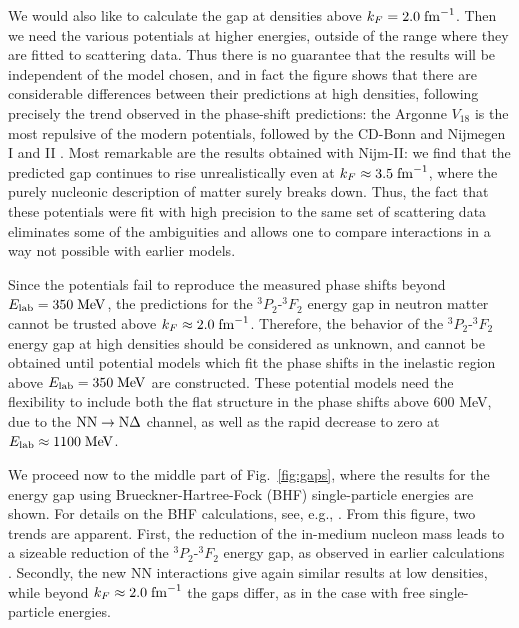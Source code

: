 \documentclass[preprint,rmp,aps,floatfix]{revtex4}
\begin{document}
We would also like to calculate the gap at densities above 
$k_F=2.0\;{\rm fm}^{-1}$.  
Then we need the various potentials at higher energies, 
outside of the range where they are fitted to scattering data.  
Thus there is no guarantee that 
the results will be independent of the model chosen, and in fact 
the figure shows that there are considerable differences 
between their predictions at high densities,
following precisely the trend observed in the phase-shift predictions:
the Argonne $V_{18}$ is the most repulsive of the modern potentials,
followed by the CD-Bonn \cite{cdbonn96} and Nijmegen I and II 
\cite{nijmegen94}.
Most remarkable are the results obtained with Nijm-II: 
we find that the predicted gap 
continues to rise unrealistically even at $k_F \approx 3.5\;{\rm fm}^{-1}$, 
where the purely nucleonic description of matter surely breaks down.
Thus, the fact that these potentials were fit with high precision 
to the same set of scattering data eliminates some of the 
ambiguities and allows one to compare interactions in a way not 
possible with earlier models.   

Since the potentials fail to reproduce the measured phase shifts 
beyond $E_{\rm lab}=350\;{\rm MeV}$, the predictions for the $^3P_2$-$^3F_2$ 
energy gap in neutron matter cannot be trusted above 
$k_F\approx 2.0\;{\rm fm}^{-1}$.  
Therefore, the behavior of the $^3P_2$-$^3F_2$ energy gap at high densities 
should be considered as unknown, and cannot be obtained until potential models 
which fit the phase shifts in the inelastic region 
above $E_{\rm lab}=350\;{\rm MeV}$ are constructed.  
These potential models need the flexibility to 
include both the flat structure in the phase shifts above 600 MeV, 
due to the ${\rm NN}\rightarrow{\rm N}\Delta$ channel, as well as the 
rapid decrease to zero at $E_{\rm lab}\approx 1100\;{\rm MeV}$.  
 
We proceed now to the middle part of Fig.~\ref{fig:gaps}, where
the results for the energy gap using Brueckner-Hartree-Fock (BHF) 
single-particle energies are shown.  
For details on the BHF calculations, see, e.g., \cite{jjm76}.  
From this figure, two trends are apparent.
First, the reduction of the in-medium nucleon mass leads to a sizeable 
reduction of the $^3P_2$-$^3F_2$ energy gap, as observed in 
earlier calculations \cite{amu85,bcll92,taka93,elga96}.  
Secondly, the new NN interactions give again similar results 
at low densities, while beyond $k_F\approx 2.0\;{\rm fm}^{-1}$ 
the gaps differ, as in the case with free single-particle energies.   
\end{document}
